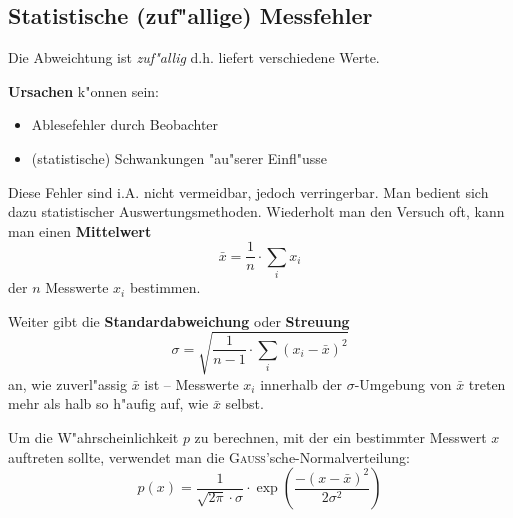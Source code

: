 \subsection{Statistische (zuf"allige) Messfehler}

\begin{Def}
   Die Abweichtung ist \emph{zuf"allig} d.h. liefert verschiedene
   Werte.
\end{Def}

\textbf{Ursachen} k"onnen sein:
\begin{itemize}
     \item Ablesefehler durch Beobachter
     \item (statistische) Schwankungen "au"serer Einfl"usse
\end{itemize}

Diese Fehler sind i.A. nicht vermeidbar, jedoch verringerbar. Man
bedient sich dazu statistischer
Auswertungsmethoden. Wiederholt man den Versuch oft,
kann man einen \textbf{Mittelwert}
\begin{equation}
     \bar x = \frac{1}{n} \cdot \sum_i x_i
\end{equation}
der $n$ Messwerte $x_i$ bestimmen. 

Weiter gibt die \textbf{Standardabweichung} oder \textbf{Streuung}
\begin{equation}
     \sigma = \sqrt{\frac{1}{n-1} \cdot \sum_i (x_i - \bar x )^2}
\end{equation}
an, wie zuverl"assig $\bar x$ ist -- Messwerte $x_i$ innerhalb der
$\sigma$-Umgebung von $\bar x$ treten mehr als halb so h"aufig auf, wie
$\bar x$ selbst.

Um die W"ahrscheinlichkeit $p$ zu berechnen, mit der ein bestimmter
Messwert $x$ auftreten sollte, verwendet man die
\textsc{Gauss}'sche-Normalverteilung:
\begin{equation}
   p(x) = \frac{1}{\sqrt{2\pi} \cdot \sigma} \cdot 
   \exp\left ( \frac{- (x-\bar x)^2}{2\sigma^2} \right )
\end{equation}













